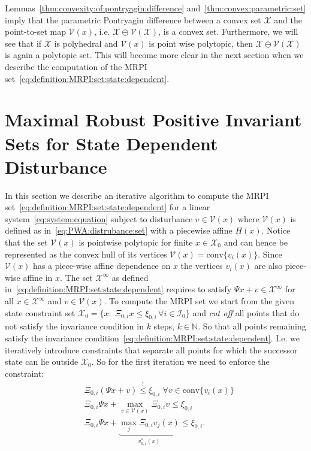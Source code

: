 \documentclass[letterpaper, 10pt, conference]{ieeeconf} %
\providecommand{\conv}{\text{conv}}
\begin{document}
%
%
\def\genmat{\Xi} \def\genvec{\xi}Lemmas~\ref{thm:convexity:of:pontryagin:difference} 
and~\ref{thm:convex:parametric:set} imply that the parametric Pontryagin difference between a convex set $\mathcal X$ and 
the point-to-set map $\mathcal V(x)$, i.e. $\mathcal X\ominus \mathcal V(\mathcal X)$, is a convex set.
Furthermore, we will see that if $\mathcal X$ is polyhedral and $\mathcal 
V(x)$ is point wise polytopic, then $\mathcal X\ominus\mathcal V(\mathcal X)$ is 
again a polytopic set. This will become more clear in the next section when we describe 
the computation of the MRPI set~\eqref{eq:definition:MRPI:set:state:dependent}.
%
%
%
%
\section{Maximal Robust Positive Invariant Sets for State Dependent Disturbance}\label{sec:state:dep:MRPI}
In this section we describe an iterative algorithm to compute the MRPI 
set~\eqref{eq:definition:MRPI:set:state:dependent} for a linear system~\eqref{eq:system:equation} subject to disturbance
$v\in\mathcal V(x)$ where $\mathcal V(x)$ is defined as in~\eqref{eq:PWA:distrubance:set} with a piecewise affine $H(x)$.
Notice that the set $\mathcal V(x)$ is pointwise polytopic for finite $x\in\mathcal X_0$ and can hence be represented as the 
convex hull of its vertices $\mathcal V(x) = \conv\{v_i(x)\}$. Since ${\mathcal{V}}(x)$
has a piece-wise affine dependence on $x$ the vertices $v_i(x)$ are also piece-wise affine in $x$.
The set $\mathcal X^\infty$ as defined in~\eqref{eq:definition:MRPI:set:state:dependent} 
requires to satisfy $\Psi x + v\in\mathcal X^\infty$ for all
$x\in\mathcal X^\infty$ and $v\in\mathcal V(x)$. To compute the MRPI set we start from the given 
state constraint set
$\mathcal X_0 = \{x:\;\genmat_{0,i}x\leq \genvec_{0,i}\,\forall i\in\mathcal I_0\}$ and 
\emph{cut off} all points that do not satisfy the invariance condition in $k$ steps, $k\in\mathbb N$. 
So that all points remaining satisfy the invariance condition~\eqref{eq:definition:MRPI:set:state:dependent}. 
I.e. we iteratively introduce 
constraints that separate all points for which the successor state can lie outside 
$\mathcal X_0$. So for the first iteration we need to enforce the constraint:
%
\begin{equation}\begin{split}
	&\genmat_{0,i}(\Psi x + v)\overset{!}{\leq}\genvec_{0,i}\;\forall v\in\conv\{v_i(x)\}\\
	&\genmat_{0,i}\Psi x + \max_{v\in\mathcal V(x)} \genmat_{0,i} v \leq \genvec_{0,i}\\
	&\genmat_{0,i}\Psi x + \underbrace{\max_{j} \genmat_{0,i} v_j(x)}_{v_{0,i}^\ast(x)} \leq \genvec_{0,i}.
\end{split}\end{equation}
\end{document}
